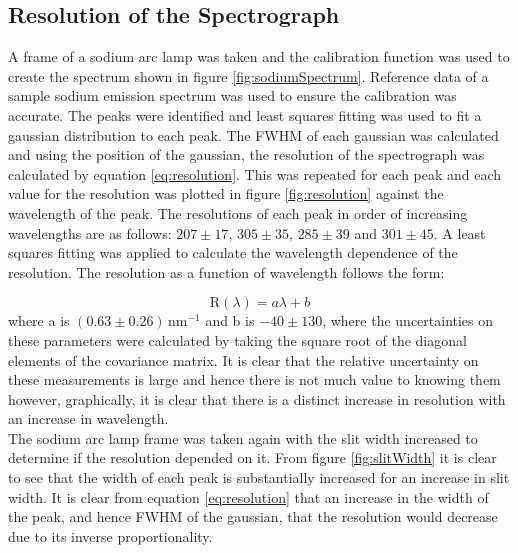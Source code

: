 \documentclass[a4paper,12pt,twocolumn]{article}
\let\cite=\supercite
\begin{document}
		\subsection{Resolution of the Spectrograph}
		A frame of a sodium arc lamp was taken and the calibration function was used to create the spectrum shown in figure \ref{fig:sodiumSpectrum}. Reference data\cite{uci} of a sample sodium emission spectrum was used to ensure the calibration was accurate. The peaks were identified and least squares fitting was used to fit a gaussian distribution to each peak. The FWHM of each gaussian was calculated and using the position of the gaussian, the resolution of the spectrograph was calculated by equation \ref{eq:resolution}. This was repeated for each peak and each value for the resolution was plotted in figure \ref{fig:resolution} against the wavelength of the peak. The resolutions of each peak in order of increasing wavelengths are as follows: $207\pm17$, $305\pm35$, $285\pm39$ and $301\pm45$. A least squares fitting was applied to calculate the wavelength dependence of the resolution. The resolution as a function of wavelength follows the form:
		
		\begin{equation}
			\text{R}(\lambda) = a\lambda + b
		\end{equation} where a is $(0.63 \pm 0.26)\,\text{nm}^{-1}$ and b is $-40 \pm 130$, where the uncertainties on these parameters were calculated by taking the square root of the diagonal elements of the covariance matrix. It is clear that the relative uncertainty on these measurements is large and hence there is not much value to knowing them however, graphically, it is clear that there is a distinct increase in resolution with an increase in wavelength.\\
	
		The sodium arc lamp frame was taken again with the slit width increased to determine if the resolution depended on it. From figure \ref{fig:slitWidth} it is clear to see that the width of each peak is substantially increased for an increase in slit width. It is clear from equation \ref{eq:resolution} that an increase in the width of the peak, and hence FWHM of the gaussian, that the resolution would decrease due to its inverse proportionality.
		
\end{document}
